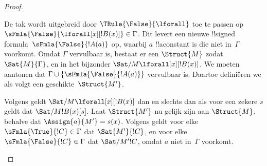 \documentclass[openany]{memoir}
\begin{document}
\begin{proof}
\begin{enumerate}
{\item De tak wordt uitgebreid door $\TRule{\False}{\lforall}$ toe te
  passen op $\sFmla{\False}{\lforall[x][!B(x)]} \in \Gamma$. Dit
  levert een nieuwe !!{signed formula}~$\sFmla{\False}{!A(a)}$ op,
  waarbij $a$ !!a{constant} is die niet in~$\Gamma$ voorkomt. Omdat
  $\Gamma$ vervulbaar is, bestaat er een $\Struct{M}$ zodat
  $\Sat{M}{\Gamma}$, en in het bijzonder
  $\Sat/{M}{\lforall[x][!B(x)]}$. We moeten aantonen dat
  $\Gamma \cup \{\sFmla{\False}{!A(a)}\}$ vervulbaar is. Daartoe
  definiëren we als volgt een geschikte~$\Struct{M'}$.

  Volgens  geldt
  $\Sat/{M}{\lforall[x][!B(x)]}$ dan en slechts dan als voor een zekere
  $s$ geldt dat $\Sat/{M}{!B(x)}[s]$. Laat $\Struct{M'}$ nu gelijk zijn
  aan $\Struct{M}$, behalve dat $\Assign{a}{M'} = s(x)$. Volgens
   geldt voor elke
  $\sFmla{\True}{!C} \in \Gamma$ dat $\Sat{M'}{!C}$, en voor elke
  $\sFmla{\False}{!C} \in \Gamma$ dat $\Sat/{M'}{!C}$, omdat $a$ niet
  in~$\Gamma$ voorkomt.

}
\end{enumerate}
\end{proof}
\end{document}
